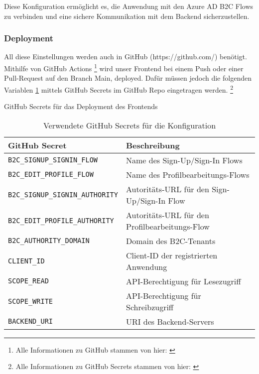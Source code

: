 Diese Konfiguration ermöglicht es, die Anwendung mit den Azure AD B2C 
Flows zu verbinden und eine sichere Kommunikation mit dem Backend sicherzustellen.

\subsubsection{Deployment}

All diese Einstellungen werden auch in GitHub (https://github.com/) benötigt.
Mithilfe von GitHub Actions \footnote{Alle Informationen zu GitHub stammen von hier: \cite{GitHuba}}
wird unser Frontend bei einem Push oder einer Pull-Request auf den Branch Main, deployed.
Dafür müssen jedoch die folgenden Variablen \ref{tab:github-secrets} mittels GitHub Secrets im GitHub Repo eingetragen werden.
\footnote{Alle Informationen zu GitHub Secrets stammen von hier: \cite{GitHub}}

\begin{table}[h t]
    \centering
    \caption{GitHub Secrets für das Deployment des Frontends}
    \label{tab:github-secrets}
    \begin{tabular}{|l|l|}
    \hline
    \textbf{GitHub Secret}              & \textbf{Beschreibung} \\ \hline
    \texttt{B2C\_SIGNUP\_SIGNIN\_FLOW}   & Name des Sign-Up/Sign-In Flows \\ \hline
    \texttt{B2C\_EDIT\_PROFILE\_FLOW}    & Name des Profilbearbeitungs-Flows \\ \hline
    \texttt{B2C\_SIGNUP\_SIGNIN\_AUTHORITY} & Autoritäts-URL für den Sign-Up/Sign-In Flow \\ \hline
    \texttt{B2C\_EDIT\_PROFILE\_AUTHORITY}  & Autoritäts-URL für den Profilbearbeitungs-Flow \\ \hline
    \texttt{B2C\_AUTHORITY\_DOMAIN}      & Domain des B2C-Tenants \\ \hline
    \texttt{CLIENT\_ID}                  & Client-ID der registrierten Anwendung \\ \hline
    \texttt{SCOPE\_READ}                 & API-Berechtigung für Lesezugriff \\ \hline
    \texttt{SCOPE\_WRITE}                & API-Berechtigung für Schreibzugriff \\ \hline
    \texttt{BACKEND\_URI}                & URI des Backend-Servers \\ \hline
    \end{tabular}
    \caption{Verwendete GitHub Secrets für die Konfiguration}
\end{table}

